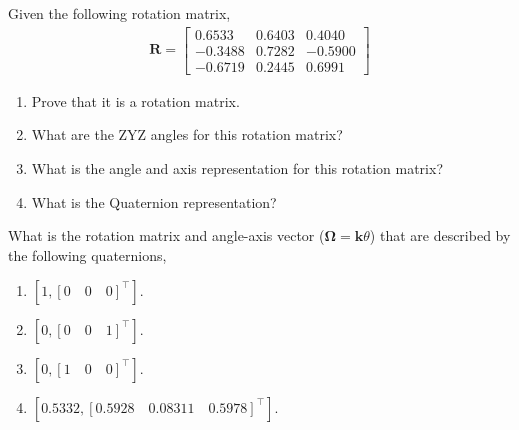 \documentclass[12pt]{article}
\newenvironment{problem}[2][Problem]{\begin{trivlist}
\item[\hskip \labelsep {\bfseries #1}\hskip \labelsep {\bfseries #2.}]}{\end{trivlist}}
\begin{document}
\begin{problem}{2}%
Given the following rotation matrix, 
\begin{align*}
        \boldsymbol{R} = \begin{bmatrix}
        0.6533 & 0.6403 & 0.4040 \\
        -0.3488 & 0.7282 & -0.5900 \\
        -0.6719 & 0.2445 & 0.6991
        \end{bmatrix}
\end{align*}
\begin{enumerate}[label=(\alph*)]
    \item Prove that it is a rotation matrix.
    \item What are the ZYZ angles for this rotation matrix?
    \item What is the angle and axis representation for this rotation matrix?
    \item What is the Quaternion representation?
\end{enumerate}
 
\end{problem}

\begin{problem}{3}%
What is the rotation matrix and angle-axis vector ($\boldsymbol{\Omega}=\widehat{\boldsymbol{k}}\theta$) that are described by the following quaternions,
\begin{enumerate}[label=(\alph*)]
    \item $[1,[0\quad 0\quad 0]^{\intercal}]$.
    \item $[0,[0\quad 0\quad 1]^{\intercal}]$.
    \item $[0,[1\quad 0\quad 0]^{\intercal}]$.
    \item $[0.5332,[0.5928\quad 0.08311\quad 0.5978]^{\intercal}]$.
\end{enumerate}
 
\end{problem}
\end{document}
